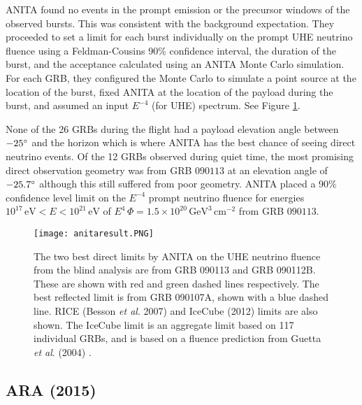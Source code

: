 \documentclass[12pt]{article}
\begin{document}
\begin{doublespace}
ANITA found no events in the prompt emission or the precursor windows of the observed bursts. This was consistent with the background expectation. They proceeded to set a limit for each burst individually on the prompt UHE neutrino fluence using a Feldman-Cousins 90\% confidence interval, the duration of the burst, and the acceptance calculated using an ANITA Monte Carlo simulation. For each GRB, they configured the Monte Carlo to simulate a point source at the location of the burst, fixed ANITA at the location of the payload during the burst, and assumed an input $E^{-4}$ (for UHE) spectrum. See Figure \ref{anitaresult}.\par
None of the 26 GRBs during the flight had a payload elevation angle between $-25 \degree$ and the horizon which is where ANITA has the best chance of seeing direct neutrino events. Of the 12 GRBs observed during quiet time, the most promising direct observation geometry was from GRB $090113$ at an elevation angle of $-25.7\degree$ although this still suffered from poor geometry. ANITA placed a 90\% confidence level limit on the $E^{-4}$ prompt neutrino fluence for energies $10^{17} \, \mathrm{eV} < E < 10^{21} \, \mathrm{eV}$ of $E^{4} \, \Phi = 1.5 \times 10^{20} \, \mathrm{ GeV^{3} \, cm^{-2}}$ from GRB $090113$. 

\begin{figure}[H]
\centering
\texttt{[image: anitaresult.PNG]}
\caption{The two best direct limits by ANITA on the UHE neutrino fluence from the blind analysis are from GRB 090113 and GRB 090112B. These are shown with red and green dashed lines respectively. The best reflected limit is from GRB 090107A, shown with a blue dashed line. RICE (Besson \textit{et al}. 2007) and IceCube (2012) \cite{IC2012} limits are also shown. The IceCube limit is an aggregate limit based on 117 individual GRBs, and is based on a fluence prediction from Guetta \textit{et al}. (2004) \cite{guetta,anita}.}
\label{anitaresult}
\end{figure}


\subsection{ARA (2015)}


\end{doublespace}
\end{document}
